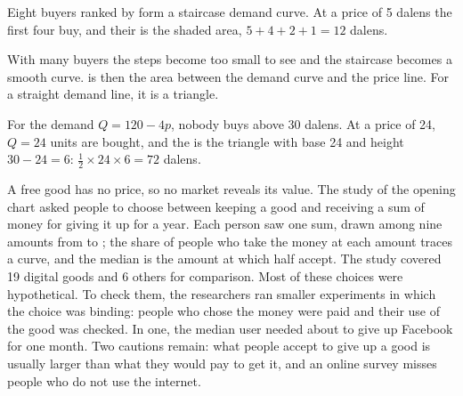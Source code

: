 \begin{omfigure}

{\small Eight buyers ranked by  form a staircase demand curve. At a price of 5 dalens the first four buy, and their  is the shaded area, $5 + 4 + 2 + 1 = 12$ dalens.}
\end{omfigure}

With many buyers the steps become too small to see and the staircase becomes a smooth curve.  is then the area between the
demand curve and the price line. For a straight demand line, it is a triangle.

\begin{example}\label{ex:g10:surplus-and-efficiency:cs-line}
For the demand $Q = 120 - 4p$, nobody buys above 30 dalens. At a price of 24, $Q = 24$ units are bought, and the  is the triangle
with base 24 and height $30 - 24 = 6$: $\tfrac12 \times 24 \times 6 = 72$ dalens.
\end{example}

\begin{measure}
A free good has no price, so no market reveals its value. The study of the opening chart asked people to choose between keeping a good and
receiving a sum of money for giving it up for a year. Each person saw one sum, drawn among nine amounts from  to ; the share of
people who take the money at each amount traces a curve, and the median is the amount at which half accept. The study covered 19 digital goods and
6 others for comparison. Most of these choices were hypothetical. To check them, the researchers ran smaller experiments in which the choice was
binding: people who chose the money were paid and their use of the good was checked. In one, the median user needed about  to give up
Facebook for one month. Two cautions remain: what people accept to give up a good is usually larger than what they would pay to get it, and an
online survey misses people who do not use the internet.
\end{measure}

